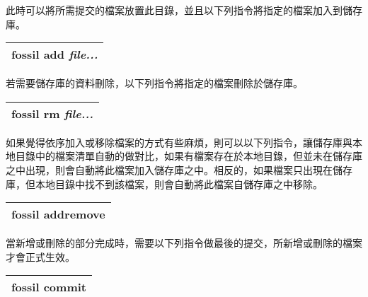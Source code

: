 \par
\renewcommand{\baselinestretch}{1} %
\twelve \hspace{0.5em} 此時可以將所需提交的檔案放置此目錄，並且以下列指令將指定的檔案加入到儲存庫。
\par
\begin{center}
\begin{tabular}{||p{15cm}|} %
\hline
\textbf{fossil add} \emph{file...}
\\
\hline
\end{tabular}
\end{center}
\par
\renewcommand{\baselinestretch}{1} %
\twelve \hspace{0.5em} 若需要儲存庫的資料刪除，以下列指令將指定的檔案刪除於儲存庫。
\par
\begin{center}
\begin{tabular}{||p{15cm}|} %
\hline
\textbf{fossil rm} \emph{file...}
\\
\hline
\end{tabular}
\end{center}
\par
\renewcommand{\baselinestretch}{1} %
\twelve \hspace{0.5em} 如果覺得依序加入或移除檔案的方式有些麻煩，則可以以下列指令，讓儲存庫與本地目錄中的檔案清單自動的做對比，如果有檔案存在於本地目錄，但並未在儲存庫之中出現，則會自動將此檔案加入儲存庫之中。相反的，如果檔案只出現在儲存庫，但本地目錄中找不到該檔案，則會自動將此檔案自儲存庫之中移除。
\par
\begin{center}
\begin{tabular}{||p{15cm}|} %
\hline
\textbf{fossil addremove}
\\
\hline
\end{tabular}
\end{center}
\par
\renewcommand{\baselinestretch}{1} %
\twelve \hspace{0.5em} 當新增或刪除的部分完成時，需要以下列指令做最後的提交，所新增或刪除的檔案才會正式生效。
\par
\begin{center}
\begin{tabular}{||p{15cm}|} %
\hline
\textbf{fossil commit}
\\
\hline
\end{tabular}
\end{center}
\par
